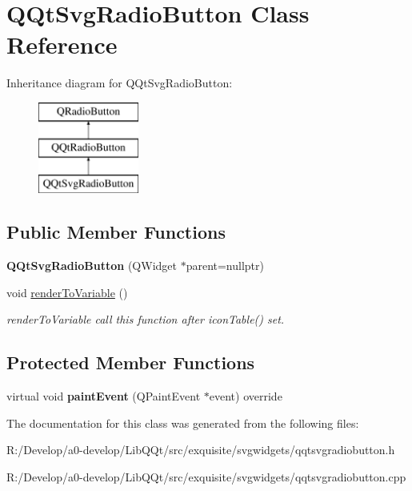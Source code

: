 \hypertarget{class_q_qt_svg_radio_button}{}\section{Q\+Qt\+Svg\+Radio\+Button Class Reference}
\label{class_q_qt_svg_radio_button}
Inheritance diagram for Q\+Qt\+Svg\+Radio\+Button\+:\begin{figure}[H]
\begin{center}
\leavevmode
\includegraphics[height=3.000000cm]{class_q_qt_svg_radio_button}
\end{center}
\end{figure}
\subsection*{Public Member Functions}
\begin{DoxyCompactItemize}
\item 
\mbox{\label{class_q_qt_svg_radio_button_ab1add1d6ea95f7f5d2b8a122a554ed32}} 
{\bfseries Q\+Qt\+Svg\+Radio\+Button} (Q\+Widget $\ast$parent=nullptr)
\item 
\mbox{\label{class_q_qt_svg_radio_button_a2e5686f5953bc59fde433460126ab4af}} 
void \mbox{\hyperlink{class_q_qt_svg_radio_button_a2e5686f5953bc59fde433460126ab4af}{render\+To\+Variable}} ()
\begin{DoxyCompactList}\small\item\em render\+To\+Variable call this function after icon\+Table() set. \end{DoxyCompactList}\end{DoxyCompactItemize}
\subsection*{Protected Member Functions}
\begin{DoxyCompactItemize}
\item 
\mbox{\label{class_q_qt_svg_radio_button_acf317e112e0d402da7abd62e1f7f0121}} 
virtual void {\bfseries paint\+Event} (Q\+Paint\+Event $\ast$event) override
\end{DoxyCompactItemize}


The documentation for this class was generated from the following files\+:\begin{DoxyCompactItemize}
\item 
R\+:/\+Develop/a0-\/develop/\+Lib\+Q\+Qt/src/exquisite/svgwidgets/qqtsvgradiobutton.\+h\item 
R\+:/\+Develop/a0-\/develop/\+Lib\+Q\+Qt/src/exquisite/svgwidgets/qqtsvgradiobutton.\+cpp\end{DoxyCompactItemize}
